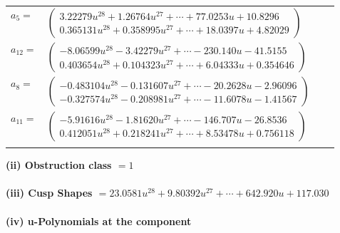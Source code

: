 \documentclass[1p]{elsarticle_modified}
\theoremstyle{definition}
\begin{document}
\begin{tabular}{m{7pt} m{180pt} m{7pt} m{180pt} }
\flushright $a_{5}=$&$\begin{pmatrix}3.22279 u^{28}+1.26764 u^{27}+\cdots+77.0253 u+10.8296\\0.365131 u^{28}+0.358995 u^{27}+\cdots+18.0397 u+4.82029\end{pmatrix}$ \\
\flushright $a_{12}=$&$\begin{pmatrix}-8.06599 u^{28}-3.42279 u^{27}+\cdots-230.140 u-41.5155\\0.403654 u^{28}+0.104323 u^{27}+\cdots+6.04333 u+0.354646\end{pmatrix}$ \\
\flushright $a_{8}=$&$\begin{pmatrix}-0.483104 u^{28}-0.131607 u^{27}+\cdots-20.2628 u-2.96096\\-0.327574 u^{28}-0.208981 u^{27}+\cdots-11.6078 u-1.41567\end{pmatrix}$ \\
\flushright $a_{11}=$&$\begin{pmatrix}-5.91616 u^{28}-1.81620 u^{27}+\cdots-146.707 u-26.8536\\0.412051 u^{28}+0.218241 u^{27}+\cdots+8.53478 u+0.756118\end{pmatrix}$\\&\end{tabular}
\flushleft \textbf{(ii) Obstruction class $= 1$}\\~\\
\flushleft \textbf{(iii) Cusp Shapes $= 23.0581 u^{28}+9.80392 u^{27}+\cdots+642.920 u+117.030$}\\~\\
\newpage\renewcommand{\arraystretch}{1}
\flushleft \textbf{(iv) u-Polynomials at the component}\newline \\
\end{document}
